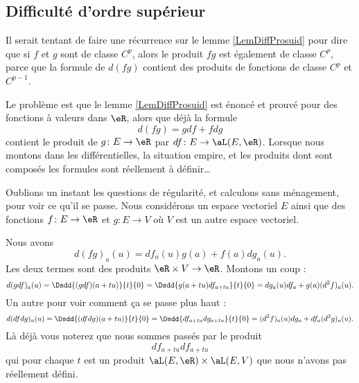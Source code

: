 \subsection{Difficulté d'ordre supérieur}

\begin{normaltext}
	Il serait tentant de faire une récurrence sur le lemme \ref{LemDiffProsuid} pour dire que si \( f\) et \( g\) sont de classe \( C^p\), alors le produit \( fg\) est également de classe \( C^p\), parce que la formule de \( d(fg)\) contient des produits de fonctions de classe \( C^p\) et \( C^{p-1}\).

	Le problème est que le lemme \ref{LemDiffProsuid} est énoncé et prouvé pour des fonctions à valeurs dans \( \eR\), alors que déjà la formule
	\begin{equation}
		d(fg)=gdf+fdg
	\end{equation}
	contient le produit de \( g\colon E\to \eR \) par \( df\colon E\to \aL(E,\eR)\). Lorsque nous montons dans les différentielles, la situation empire, et les produits dont sont composés les formules sont réellement à définir\ldots
\end{normaltext}

Oublions un instant les questions de régularité, et calculons sans ménagement, pour voir ce qu'il se passe. Nous considérons un espace vectoriel \( E\) ainsi que des fonctions \( f\colon E\to \eR\) et \( g\colon E \to V\) où \( V\) est un autre espace vectoriel.

Nous avons
\begin{equation}
	d(fg)_a(u)=df_a(u)g(a)+f(a)dg_a(u).
\end{equation}
Les deux termes sont des produits \( \eR\times V\to \eR\). Montons un coup :
\begin{equation}
	d(gdf)_a(u)=\Dsdd{ (gdf)(a+tu) }{t}{0}=\Dsdd{ g(a+tu)df_{a+tu} }{t}{0}=dg_a(u)df_a+g(a)(d^2f)_a(u).
\end{equation}
Un autre pour voir comment ça se passe plus haut :
\begin{equation}
	d(dfdg)_a(u)=\Dsdd{ (dfdg)(a+tu) }{t}{0}=\Dsdd{ df_{a+tu}dg_{a+tu} }{t}{0}=(d^2f)_a(u)dg_a+df_a(d^2g)_a(u).
\end{equation}
Là déjà vous noterez que nous sommes passés par le produit
\begin{equation}
	df_{a+tu}df_{a+tu}
\end{equation}
qui pour chaque \( t\) est un produit \( \aL(E,\eR)\times \aL(E,V)\) que nous n'avons pas réellement défini.

